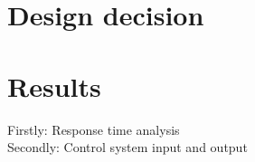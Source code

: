 


\section{Design decision}

\section{Results}
Firstly: Response time analysis\\
Secondly: Control system input and output










%

